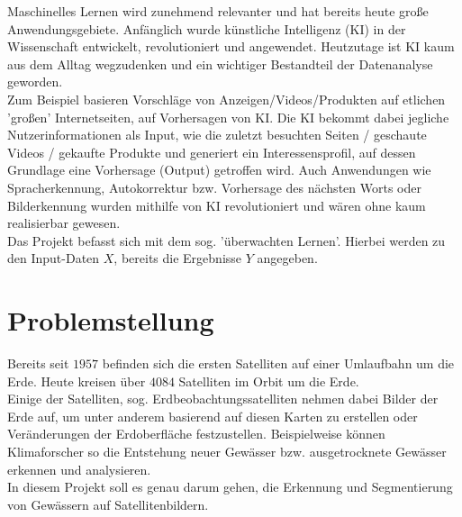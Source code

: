 Maschinelles Lernen wird zunehmend relevanter und hat bereits heute große Anwendungsgebiete.
Anfänglich wurde künstliche Intelligenz (KI) in der Wissenschaft entwickelt, revolutioniert und angewendet.
Heutzutage ist KI kaum aus dem Alltag wegzudenken und ein wichtiger Bestandteil der Datenanalyse geworden.
\\
Zum Beispiel basieren Vorschläge von Anzeigen/Videos/Produkten auf etlichen 'großen' Internetseiten, auf Vorhersagen von KI.
Die KI bekommt dabei jegliche Nutzerinformationen als Input, wie die zuletzt besuchten Seiten / geschaute Videos / gekaufte Produkte und generiert ein Interessensprofil, auf dessen Grundlage eine Vorhersage (Output) getroffen wird.
Auch Anwendungen wie Spracherkennung, Autokorrektur bzw. Vorhersage des nächsten Worts oder Bilderkennung wurden mithilfe von KI revolutioniert und wären ohne kaum realisierbar gewesen.
\\
%
Das Projekt befasst sich mit dem sog. 'überwachten Lernen'.
Hierbei werden zu den Input-Daten $X$, bereits die Ergebnisse $Y$ angegeben.

\section{Problemstellung}
Bereits seit $1957$ befinden sich die ersten Satelliten auf einer Umlaufbahn um die Erde.
Heute kreisen über $4084$ Satelliten im Orbit um die Erde.\cite{ucsusa}
\\
Einige der Satelliten, sog. Erdbeobachtungssatelliten nehmen dabei Bilder der Erde auf, um unter anderem basierend auf diesen Karten zu erstellen oder Veränderungen der Erdoberfläche festzustellen.
Beispielweise können Klimaforscher so die Entstehung neuer Gewässer bzw. ausgetrocknete Gewässer erkennen und analysieren.
\\
In diesem Projekt soll es genau darum gehen, die Erkennung und Segmentierung von Gewässern auf Satellitenbildern.
\\

